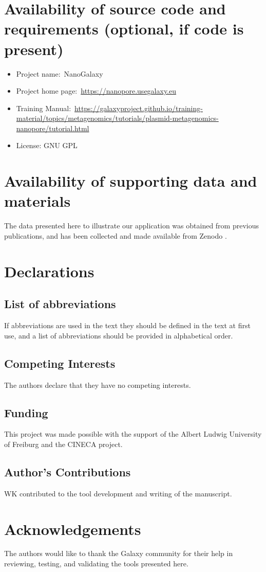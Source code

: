 \documentclass[a4paper,num-refs]{oup-contemporary}
\begin{document}
\section{Availability of source code and requirements (optional, if code is present)}

\begin{itemize}
\item Project name:~NanoGalaxy
\item Project home page:~\url{https://nanopore.usegalaxy.eu}
\item Training Manual:~\url{https://galaxyproject.github.io/training-material/topics/metagenomics/tutorials/plasmid-metagenomics-nanopore/tutorial.html}
\item License: GNU GPL
\end{itemize}

\section{Availability of supporting data and materials}

The data presented here to illustrate our application was obtained from previous publications, and has been collected and made available from Zenodo \cite{TODO}.

\section{Declarations}

\subsection{List of abbreviations}
If abbreviations are used in the text they should be defined in the text at first use, and a list of abbreviations should be provided in alphabetical order.

\subsection{Competing Interests}
The authors declare that they have no competing interests.

\subsection{Funding}
This project was made possible with the support of the Albert Ludwig University of Freiburg and the CINECA project.


\subsection{Author's Contributions}
WK contributed to the tool development and writing of the manuscript.


\section{Acknowledgements}
The authors would like to thank the Galaxy community for their help in reviewing, testing, and validating the tools presented here.


\end{document}
